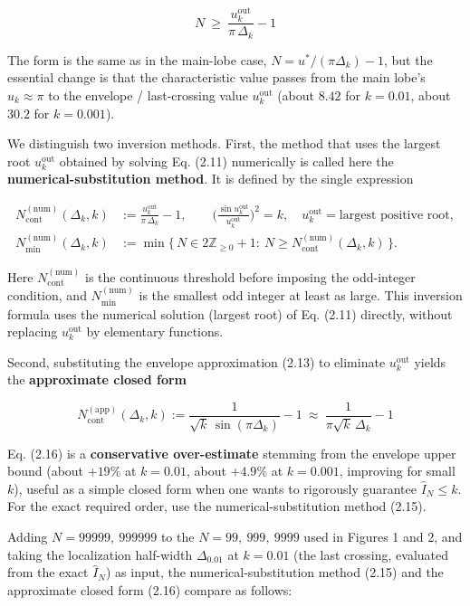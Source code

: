 \documentclass[
]{ltjsarticle}
\begin{document}
\[
N\ \ge\ \frac{u_k^{\mathrm{out}}}{\pi\,\Delta_k}-1
\tag{2.14}
\]

The form is the same as in the main-lobe case,
\(N=u^{\ast}/(\pi\Delta_k)-1\), but the essential change is that the
characteristic value passes from the main lobe's \(u_k\approx\pi\) to
the envelope / last-crossing value \(u_k^{\mathrm{out}}\) (about
\(8.42\) for \(k=0.01\), about \(30.2\) for \(k=0.001\)).

We distinguish two inversion methods. First, the method that uses the
largest root \(u_k^{\mathrm{out}}\) obtained by solving Eq. (2.11)
numerically is called here the \textbf{numerical-substitution method}.
It is defined by the single expression

\[
\begin{aligned}
N_{\mathrm{cont}}^{(\mathrm{num})}(\Delta_k,k)
&:=\frac{u_k^{\mathrm{out}}}{\pi\,\Delta_k}-1,
\qquad
\Big(\frac{\sin u_k^{\mathrm{out}}}{u_k^{\mathrm{out}}}\Big)^2=k,\quad u_k^{\mathrm{out}}=\text{largest positive root},\\
N_{\min}^{(\mathrm{num})}(\Delta_k,k)
&:=\min\Big\{\,N\in 2\mathbb{Z}_{\ge 0}+1:\ N\ge N_{\mathrm{cont}}^{(\mathrm{num})}(\Delta_k,k)\,\Big\}.
\end{aligned}
\tag{2.15}
\]

Here \(N_{\mathrm{cont}}^{(\mathrm{num})}\) is the continuous threshold
before imposing the odd-integer condition, and
\(N_{\min}^{(\mathrm{num})}\) is the smallest odd integer at least as
large. This inversion formula uses the numerical solution (largest root)
of Eq. (2.11) directly, without replacing \(u_k^{\mathrm{out}}\) by
elementary functions.

Second, substituting the envelope approximation (2.13) to eliminate
\(u_k^{\mathrm{out}}\) yields the \textbf{approximate closed form}

\[
N_{\mathrm{cont}}^{(\mathrm{app})}(\Delta_k,k)
:=\frac{1}{\sqrt{k}\,\sin(\pi\Delta_k)}-1
\ \approx\ \frac{1}{\pi\sqrt{k}\,\Delta_k}-1
\tag{2.16}
\]

Eq. (2.16) is a \textbf{conservative over-estimate} stemming from the
envelope upper bound (about \(+19\%\) at \(k=0.01\), about \(+4.9\%\) at
\(k=0.001\), improving for small \(k\)), useful as a simple closed form
when one wants to rigorously guarantee \(\widehat{I}_N\le k\). For the
exact required order, use the numerical-substitution method (2.15).

Adding \(N=99999,\ 999999\) to the \(N=99,\ 999,\ 9999\) used in Figures
1 and 2, and taking the localization half-width \(\Delta_{0.01}\) at
\(k=0.01\) (the last crossing, evaluated from the exact
\(\widehat{I}_N\)) as input, the numerical-substitution method (2.15)
and the approximate closed form (2.16) compare as follows:
\end{document}
